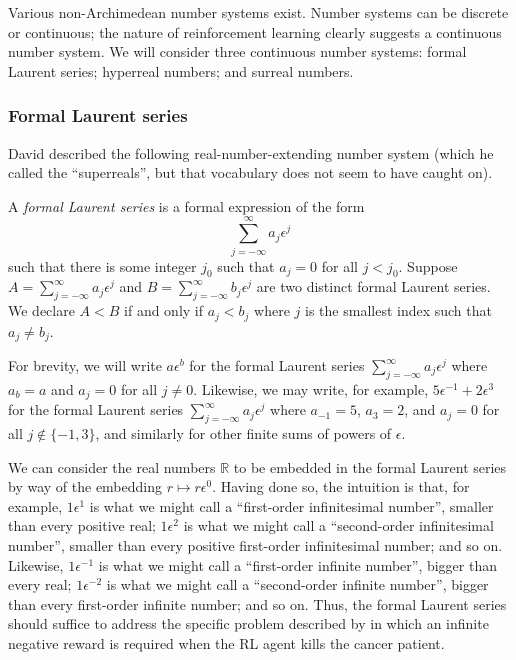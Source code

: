 \documentclass[twoside,11pt]{article}
\begin{document}
Various non-Archimedean number systems exist. Number systems can be
discrete or continuous; the nature of reinforcement learning clearly
suggests a continuous number system. We will consider three continuous
number systems: formal Laurent series; hyperreal numbers; and
surreal numbers.

\subsubsection{Formal Laurent series}

David \cite{tall1980looking} described the following
real-number-extending number system (which he called the ``superreals'', but
that vocabulary does not seem to have caught on).

\begin{definition}
A \emph{formal Laurent series} is a formal expression of the form
\[
\sum_{j=-\infty}^\infty a_j \epsilon^j
\]
such that there is some integer $j_0$ such that $a_j=0$ for all $j<j_0$.
Suppose $A=\sum_{j=-\infty}^\infty a_j\epsilon^j$
and $B=\sum_{j=-\infty}^\infty b_j\epsilon^j$ are two distinct formal Laurent series.
We declare $A<B$ if and only if $a_j<b_j$ where $j$ is the smallest
index such that $a_j\not=b_j$.
\end{definition}

For brevity, we will write $a\epsilon^b$ for the formal Laurent series
$\sum_{j=-\infty}^{\infty} a_j\epsilon^j$ where $a_b=a$ and $a_j=0$ for all $j\not=0$.
Likewise, we may write, for example, $5\epsilon^{-1}+2\epsilon^3$ for the
formal Laurent series $\sum_{j=-\infty}^{\infty} a_j\epsilon^j$ where $a_{-1}=5$,
$a_3=2$, and $a_j=0$ for all $j\not\in\{-1,3\}$, and similarly for other
finite sums of powers of $\epsilon$.

We can consider the real numbers $\mathbb R$ to be embedded in the formal Laurent
series by way of the embedding $r\mapsto r\epsilon^0$. Having done so, the intuition is that,
for example, $1\epsilon^1$ is what we might call a ``first-order
infinitesimal number'', smaller
than every positive real;
$1\epsilon^2$ is what we might call a ``second-order infinitesimal number'',
smaller than every
positive first-order infinitesimal number; and so on. Likewise,
$1\epsilon^{-1}$ is what we might call a ``first-order infinite number'', bigger than
every real; $1\epsilon^{-2}$ is what we might call a ``second-order infinite number'', bigger
than every first-order infinite number; and so on. Thus, the formal Laurent series
should suffice to address the specific problem described by
\cite{wirth2017survey} in which an infinite negative reward is required when the
RL agent kills the cancer patient.
\end{document}
